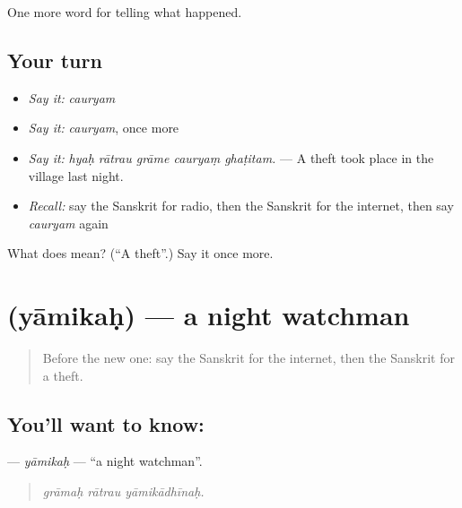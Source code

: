 \begin{grammarlens}[title={What you've built}]
One more word for telling what happened.
\end{grammarlens}

\subsection*{Your turn}
\begin{itemize}
\raggedright
  \item \emph{Say it:} \emph{cauryam}
  \item \emph{Say it:} \emph{cauryam}, once more
  \item \emph{Say it:} \emph{hyaḥ rātrau grāme cauryaṃ ghaṭitam.} — A theft took place in the village last night.
  \item \emph{Recall:} say the Sanskrit for radio, then the Sanskrit for the internet, then say \emph{cauryam} again
\end{itemize}

\begin{tcolorbox}[breakable,colback=teal!4,colframe=teal!35!black,title={Before you move on}]
What does  mean? (\textquotedblleft{}A theft\textquotedblright{}.) Say it once more.
\end{tcolorbox}
\section[\texorpdfstring{\sk{यामिकः} (yāmikaḥ)}{यामिकः (yāmikaḥ)}]{ (yāmikaḥ) — a night watchman}

\label{lesson:SA-C286-yamikah}



\begin{quote}
Before the new one: say the Sanskrit for the internet, then the Sanskrit for a theft.
\end{quote}

\subsection*{You'll want to know: }
\textbf{} — \emph{yāmikaḥ} — \textquotedblleft{}a night watchman\textquotedblright{}.

\begin{quote}
  
\end{quote}

\begin{quote}
\emph{grāmaḥ rātrau yāmikādhīnaḥ.}
\end{quote}

